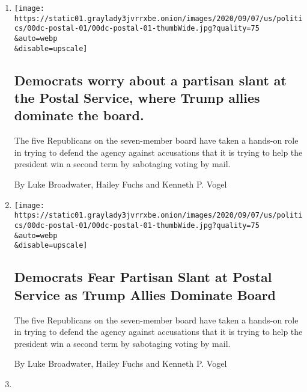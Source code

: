 \begin{enumerate}
\def\labelenumi{\arabic{enumi}.}
\item
  \href{/live/2020/09/09/us/trump-vs-biden/democrats-worry-about-a-partisan-slant-at-the-postal-service-where-trump-allies-dominate-the-board}{}

  \texttt{[image: https://static01.graylady3jvrrxbe.onion/images/2020/09/07/us/politics/00dc-postal-01/00dc-postal-01-thumbWide.jpg?quality=75\\\&auto=webp\\\&disable=upscale]}

  \hypertarget{democrats-worry-about-a-partisan-slant-at-the-postal-service-where-trump-allies-dominate-the-board}{%
  \subsection{Democrats worry about a partisan slant at the Postal
  Service, where Trump allies dominate the
  board.}\label{democrats-worry-about-a-partisan-slant-at-the-postal-service-where-trump-allies-dominate-the-board}}

  The five Republicans on the seven-member board have taken a hands-on
  role in trying to defend the agency against accusations that it is
  trying to help the president win a second term by sabotaging voting by
  mail.

  By Luke Broadwater, Hailey Fuchs and Kenneth P. Vogel
\item
  \href{/2020/09/08/us/politics/democrats-postal-service-board-trump.html}{}

  \texttt{[image: https://static01.graylady3jvrrxbe.onion/images/2020/09/07/us/politics/00dc-postal-01/00dc-postal-01-thumbWide.jpg?quality=75\\\&auto=webp\\\&disable=upscale]}

  \hypertarget{democrats-fear-partisan-slant-at-postal-service-as-trump-allies-dominate-board}{%
  \subsection{Democrats Fear Partisan Slant at Postal Service as Trump
  Allies Dominate
  Board}\label{democrats-fear-partisan-slant-at-postal-service-as-trump-allies-dominate-board}}

  The five Republicans on the seven-member board have taken a hands-on
  role in trying to defend the agency against accusations that it is
  trying to help the president win a second term by sabotaging voting by
  mail.

  By Luke Broadwater, Hailey Fuchs and Kenneth P. Vogel
\item
  \href{/2020/09/08/us/elections/a-top-house-democrat-calls-for-the-suspension-of-postmaster-general-louis-dejoy-over-campaign-finance-allegations.html}{}


\end{enumerate}
